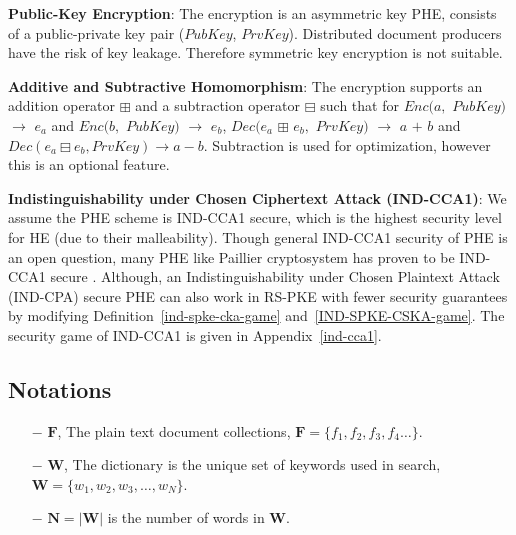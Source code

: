 \documentclass[sigconf,pdftex]{acmart}
\begin{document}
 
 






{\textbf{Public-Key Encryption}}: The encryption is an asymmetric key PHE, consists of a public-private key pair ($PubKey$, $PrvKey$). Distributed document producers have the risk of key leakage. Therefore symmetric key encryption is not suitable.
    
{\textbf{Additive and Subtractive Homomorphism}}: The encryption supports an addition operator $\boxplus$ and a subtraction operator $\boxminus$ such that for $Enc(a,$ $PubKey)$ $\xrightarrow{}$  $e_a$ and $Enc(b,$ $PubKey)$ $\xrightarrow{}$ $e_b$, $Dec(e_a$ $\boxplus$ $e_b,$ $PrvKey)$ $\xrightarrow{}$ $a$ $+$ $b$ and $Dec(e_a \boxminus e_b, PrvKey) \xrightarrow{} a-b$. Subtraction is used for optimization, however this is an optional feature. 
    
{\textbf{Indistinguishability under Chosen Ciphertext Attack (IND-CCA1)}}: We assume the PHE scheme is IND-CCA1 secure, which is the highest security level for HE (due to their malleability). Though general IND-CCA1 security of PHE is an open question, many PHE like Paillier cryptosystem has proven to be IND-CCA1 secure \cite{lipmaa2010cca1, armknecht2013group}. Although, an Indistinguishability under Chosen Plaintext Attack (IND-CPA) secure PHE can also work in RS-PKE with fewer security guarantees by modifying Definition~\ref{ind-spke-cka-game} and~\ref{IND-SPKE-CSKA-game}. The security game of IND-CCA1 is given in Appendix~\ref{ind-cca1}.
    
    
 

\subsection{Notations}
\begin{itemize}
\item[$-$] $\boldsymbol{F}$, The  plain text document collections, $\boldsymbol{F} = \{f_1, f_2, f_3, f_4\dots\}$.

\item[$-$] $\boldsymbol{W}$, The dictionary is the unique set of keywords used in search, $\boldsymbol{W} = \{w_1, w_2, w_3,\dots,w_N\}$.

\item[$-$] $\boldsymbol{N}=|\boldsymbol{W}|$ is the number of words in $\boldsymbol{W}$.
\end{itemize}
\end{document}
